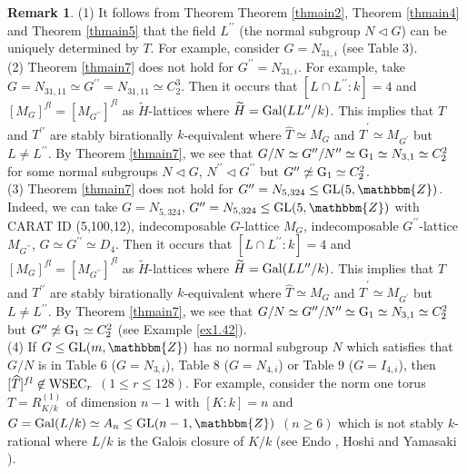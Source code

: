 \documentclass{amsart}
\theoremstyle{plain}
\theoremstyle{definition}
\newtheorem{remark}[theorem]{Remark}
\theoremstyle{remark}
\newcommand{\bZ}{\mathbbm{Z}}\newcommand{\bQ}{\mathbbm{Q}}
\newcommand{\GL}{{\rm GL}}\newcommand{\SL}{{\rm SL}}
\newcounter{sub}\def\tr{\mbox{tr }}
\begin{document}
\begin{remark}\label{rem1.41}
(1) It follows from Theorem {Theorem \ref{thmain2}}, 
{Theorem \ref{thmain4}} and {Theorem \ref{thmain5}} that 
the field $L^{\prime\prime}$ (the normal subgroup $N\lhd G$) 
can be uniquely determined by $T$. 
For example, consider $G=N_{31,i}$ (see Table $3$).\\
(2) Theorem \ref{thmain7} does not hold for $G^{\prime\prime}=N_{31,i}$. 
For example, take $G=N_{31,11}\simeq G^{\prime\prime}=N_{31,11}\simeq C_2^3$. 
Then it occurs that $[L\cap L^{\prime\prime}:k]=4$ and 
$[M_G]^{fl}=[M_{G^{\prime\prime}}]^{fl}$ as $\widetilde{H}$-lattices 
where $\widetilde{H}={\rm Gal}(LL^{\prime\prime}/k)$. 
This implies that $T$ and $T^{\prime\prime}$ are 
stably birationally $k$-equivalent 
where $\widehat{T}\simeq M_G$ and 
$\widehat{T}^\prime\simeq M_{G^\prime}$ 
but $L\neq L^{\prime\prime}$. 
%
By Theorem \ref{thmain7}, 
we see that $ G/N\simeq G^{\prime\prime}/N^{\prime\prime}\simeq {\rm G}_1\simeq 
N_{3,1}\simeq C_2^2$ 
for some normal subgroups $N\lhd G$, $N^{\prime\prime}\lhd G^{\prime\prime}$ 
but $G^{\prime\prime}\not\simeq {\rm G}_1\simeq C_2^2$. \\
(3) Theorem \ref{thmain7} does not hold for 
$G^{\prime\prime}=N_{5,324}\leq {\rm GL}(5,\bZ)$. 
Indeed, we can take $G=N_{5,324}$, $G^{\prime\prime}=N_{5,324}\leq \GL(5,\bZ)$ 
with CARAT ID (5,100,12), 
indecomposable $G$-lattice $M_G$, 
indecomposable $G^{\prime\prime}$-lattice $M_{G^{\prime\prime}}$, 
$G\simeq G^{\prime\prime}\simeq D_4$. 
Then it occurs that 
$[L\cap L^{\prime\prime}:k]=4$ and 
$[M_G]^{fl}=[M_{G^{\prime\prime}}]^{fl}$ as $\widetilde{H}$-lattices 
where $\widetilde{H}={\rm Gal}(LL^{\prime\prime}/k)$. 
This implies that $T$ and $T^{\prime\prime}$ are 
stably birationally $k$-equivalent 
where $\widehat{T}\simeq M_G$ and 
$\widehat{T}^\prime\simeq M_{G^\prime}$ 
but $L\neq L^{\prime\prime}$. 
%
By Theorem \ref{thmain7}, 
we see that $G/N\simeq G^{\prime\prime}/N^{\prime\prime}\simeq {\rm G}_1\simeq 
N_{3,1}\simeq C_2^2$ but $G^{\prime\prime}\not\simeq {\rm G}_1\simeq C_2^2$ 
(see Example \ref{ex1.42}).\\ 
(4) If $G\leq \GL(m,\bZ)$ has no normal subgroup $N$ 
which satisfies that 
$G/N$ is in Table $6$ ($G=N_{3,i}$), Table $8$ ($G=N_{4,i}$) or 
Table $9$ ($G=I_{4,i}$), then 
$[\widehat{T}]^{fl}\not\in {\rm WSEC}_r$ $(1\leq r\leq 128)$. 
For example, consider the norm one torus 
$T=R^{(1)}_{K/k}$ of dimension $n-1$ with $[K:k]=n$ and 
$G={\rm Gal}(L/k)\simeq A_n\leq \GL(n-1,\bZ)$ $(n\geq 6)$ 
which is not stably $k$-rational 
where $L/k$ is the Galois closure of $K/k$ 
(see Endo \cite[Theorem 4.4]{End11}, 
Hoshi and Yamasaki \cite[Corollary 1.11]{HY17}). 
\end{remark}
\end{document}
